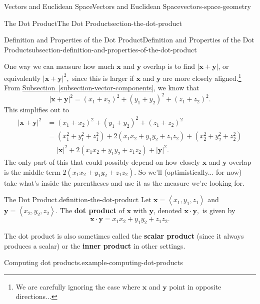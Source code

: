 \documentclass[oneside,10pt,]{book}
\newcommand{\terminology}[1]{\textbf{#1}}
\numberwithin{equation}{section}
\newcommand{\vv}[1]{\mathbf{#1}}
\newcommand{\dotprod}[1]{\left\langle #1 \right\rangle}
\begin{document}
\begin{chapterptx}{Vectors and Euclidean Space}{}{Vectors and Euclidean Space}{}{}{vectors-space-geometry}
\begin{sectionptx}{The Dot Product}{}{The Dot Product}{}{}{section-the-dot-product}
\begin{subsectionptx}{Definition and Properties of the Dot Product}{}{Definition and Properties of the Dot Product}{}{}{subsection-definition-and-properties-of-the-dot-product}
\begin{figure}
{
}
\end{figure}
\hypertarget{p-1126}{}%
One way we can measure how much \(\vv{x}\) and \(\vv{y}\) overlap is to find \(|\vv{x}+\vv{y}|\), or equivalently \(|\vv{x}+\vv{y}|^{2},\) since this is larger if \(\vv{x}\) and \(\vv{y}\) are more closely aligned.\footnote{We are carefully ignoring the case where \(\vv{x}\) and \(\vv{y}\) point in opposite directions...\label{fn-5}} From \hyperref[subsection-vector-components]{Subsection~\ref{subsection-vector-components}}, we know that%
%
\begin{equation*}
|\vv{x}+\vv{y}|^{2} = (x_{1}+x_{2})^{2} + (y_{1}+y_{2})^{2} + (z_{1}+z_{2})^{2}.
\end{equation*}
\hypertarget{p-1127}{}%
This simplifies out to%
%
\begin{align*}
|\vv{x}+\vv{y}|^{2} & = (x_{1}+x_{2})^{2} + (y_{1}+y_{2})^{2} + (z_{1}+z_{2})^{2} \\
& = (x_{1}^{2}+y_{1}^{2}+z_{1}^{2}) + 2(x_{1}x_{2} + y_{1}y_{2} + z_{1}z_{2}) + (x_{2}^{2} + y_{2}^{2} + z_{2}^{2}) \\
& = |\vv{x}|^{2} + 2(x_{1}x_{2} + y_{1}y_{2} + z_{1}z_{2}) + |\vv{y}|^{2}. 
\end{align*}
\hypertarget{p-1128}{}%
The only part of this that could possibly depend on how closely \(\vv{x}\) and \(\vv{y}\) overlap is the middle term \(2(x_{1}x_{2}+y_{1}y_{2}+z_{1}z_{2})\). So we'll (optimistically... for now) take what's inside the parentheses and use it as the measure we're looking for.%
\begin{definition}{The Dot Product.}{definition-the-dot-product}%
\hypertarget{p-1129}{}%
Let \(\vv{x} = \dotprod{x_{1},y_{1},z_{1}}\) and \(\vv{y} = \dotprod{x_{2},y_{2},z_{2}}\). The \terminology{dot product} of \(\vv{x}\) with \(\vv{y}\), denoted \(\vv{x}\cdot\vv{y},\) is given by%
%
\begin{equation*}
\vv{x}\cdot\vv{y} = x_{1}x_{2}+y_{1}y_{2}+z_{1}z_{2}.
\end{equation*}
\end{definition}
\hypertarget{p-1130}{}%
The dot product is also sometimes called the \terminology{scalar product} (since it always produces a scalar) or the \terminology{inner product} in other settings.%
\begin{example}{Computing dot products.}{example-computing-dot-products}%

\end{example}
\end{subsectionptx}
\end{sectionptx}
\end{chapterptx}
\end{document}
